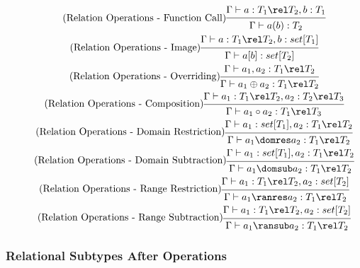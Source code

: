 \documentclass{article}
\begin{document}
\begin{gather}
\tag{Relation Operations - Function Call}
\begin{prooftree}
\hypo{\Gamma \vdash a: T_1 \rel T_2, b:T_1}
\infer1{\Gamma \vdash  a(b):T_2}
\end{prooftree}
\\
\tag{Relation Operations - Image}
\begin{prooftree}
\hypo{\Gamma \vdash a: T_1 \rel T_2, b: set[T_1]}
\infer1{\Gamma \vdash a[b]: set[T_2]}
\end{prooftree}
\\
\tag{Relation Operations - Overriding}
\begin{prooftree}
\hypo{\Gamma \vdash a_1, a_2: T_1 \rel T_2}
\infer1{\Gamma \vdash a_1 \oplus a_2: T_1 \rel T_2}
\end{prooftree}
\\
\tag{Relation Operations - Composition}
\begin{prooftree}
\hypo{\Gamma \vdash a_1: T_1 \rel T_2, a_2: T_2 \rel T_3}
\infer1{\Gamma \vdash a_1 \circ a_2: T_1 \rel T_3}
\end{prooftree}
\\
\tag{Relation Operations - Domain Restriction}
\begin{prooftree}
\hypo{\Gamma \vdash a_1: set[T_1], a_2: T_1 \rel T_2}
\infer1{\Gamma \vdash a_1 \domres a_2: T_1 \rel T_2}
\end{prooftree}
\\
\tag{Relation Operations - Domain Subtraction}
\begin{prooftree}
\hypo{\Gamma \vdash a_1: set[T_1], a_2: T_1 \rel T_2}
\infer1{\Gamma \vdash a_1 \domsub a_2: T_1 \rel T_2}
\end{prooftree}
\\
\tag{Relation Operations - Range Restriction}
\begin{prooftree}
\hypo{\Gamma \vdash a_1: T_1 \rel T_2, a_2: set[T_2]}
\infer1{\Gamma \vdash a_1 \ranres a_2: T_1 \rel T_2}
\end{prooftree}
\\
\tag{Relation Operations - Range Subtraction}
\begin{prooftree}
\hypo{\Gamma \vdash a_1: T_1 \rel T_2, a_2: set[T_2]}
\infer1{\Gamma \vdash a_1 \ransub a_2: T_1 \rel T_2}
\end{prooftree}
\end{gather}

\subsubsection{Relational Subtypes After Operations}
\end{document}
